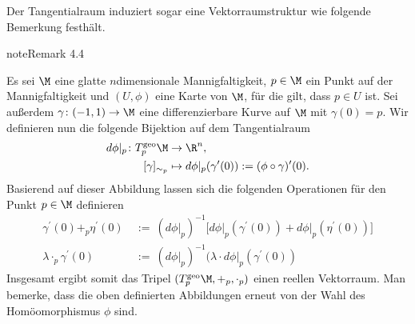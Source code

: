 \documentclass[letterpaper,10pt,english]{jupyterBook}
\begin{document}
\sphinxAtStartPar
Der Tangentialraum induziert sogar eine Vektorraumstruktur wie folgende Bemerkung festhält.
\label{manifolds/tangential:remark-6}
\begin{sphinxadmonition}{note}{Remark 4.4}



\sphinxAtStartPar
Es sei \(\M\) eine glatte \(n\)\sphinxhyphen{}dimensionale Mannigfaltigkeit, \(p\in\M\) ein Punkt auf der Mannigfaltigkeit und \((U,\phi)\) eine Karte von \(\M\), für die gilt, dass \(p\in U\) ist.
Sei außerdem \(\gamma \colon (-1,1) \rightarrow \M\) eine differenzierbare Kurve auf \(\M\) mit \(\gamma(0) = p\).
Wir definieren nun die folgende Bijektion auf dem Tangentialraum
\begin{equation*}
\begin{split}d\phi\rvert_p \colon T^{\text{geo}}_p\M &\rightarrow \R^n,\\
[\gamma]_{\sim_p} &\mapsto d\phi\rvert_p (\gamma^\prime(0)) := (\phi \circ \gamma)^\prime (0).\end{split}
\end{equation*}
\sphinxAtStartPar
Basierend auf dieser Abbildung lassen sich die folgenden Operationen für den Punkt \(p \in \M\) definieren
\begin{equation*}
\begin{split}\gamma^\prime(0) +_{p} \eta^\prime(0) \ &:= \
(d\phi\rvert_p)^{-1}\big[d\phi\rvert_p(\gamma^\prime(0)) + d\phi\rvert_p(\eta^\prime(0))\big]\\
\lambda \cdot_p \gamma^\prime(0) \ &:= \ (d\phi\rvert_p)^{-1} (\lambda \cdot d\phi\rvert_p(\gamma^\prime(0))\end{split}
\end{equation*}
\sphinxAtStartPar
Insgesamt ergibt somit das Tripel \((T_p^{\text{geo}}\M, +_p, \cdot_p)\) einen reellen Vektorraum.
Man bemerke, dass die oben definierten Abbildungen erneut \sphinxstylestrong{unabhängig} von der Wahl des Homöomorphismus \(\phi\) sind.
\end{sphinxadmonition}
\end{document}
